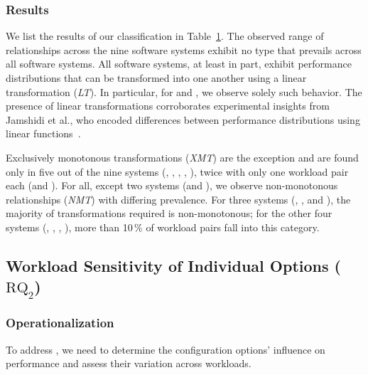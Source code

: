 {{\begin{table}
\begin{tabular}{p{1.1cm}rrrrrrr}
	\bottomrule
	\end{tabular}
	\label{tab:categorization_counts}
\end{table}

\subsubsection{Results}
{\color{black}
We list the results of our classification in Table~\ref{tab:categorization_counts}. The observed range of relationships across the nine software systems exhibit no type that prevails across all software systems. 
All software systems, at least in part, exhibit performance distributions that can be transformed into one another using a linear transformation (\textit{\colorbox{lt-color!60}{LT}}). In particular, for \jumper and \xzwo, we observe solely such behavior. The presence of linear transformations corroborates experimental insights from Jamshidi et al., who encoded differences between performance distributions using linear functions~\cite{jamishidi_transfer_2017}.

Exclusively monotonous transformations (\textit{\colorbox{xmt-color!60}{XMT}}) are the exception and are found only in five out of the nine systems (\kanzi, \batik, \xz, \lrzip, \zdrei), twice with only one workload pair each (\xz and \zdrei).  
For all, except two systems (\jumper and \xzwo), we observe non-monotonous relationships (\textit{\colorbox{nmt-color!60}{NMT}}) with differing prevalence.  For three systems (\dconvert, \htwo, and \zdrei), the majority of transformations required is non-monotonous; for the other four systems (\kanzi, \batik, \xz, \lrzip), more than 10\,\% of workload pairs fall into this category.

\subsection{Workload Sensitivity of Individual Options ($\text{RQ}_\text{2}$)}\label{sec:rq2}
\subsubsection{Operationalization}
To address , we need to determine the configuration options’ influence on performance and assess their variation across workloads. 
}}}
